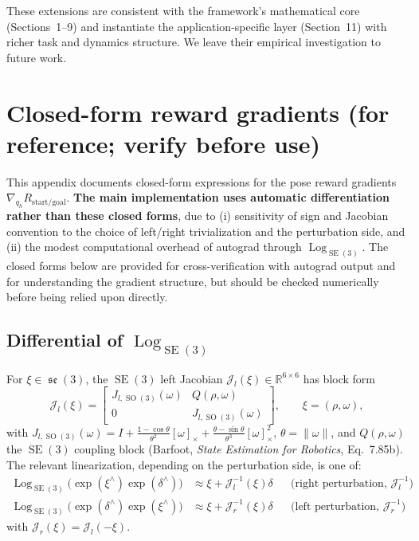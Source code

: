 \documentclass[11pt,a4paper]{article}
\DeclareMathOperator{\Log}{Log}
\DeclareMathOperator{\SE}{SE}
\DeclareMathOperator{\SO}{SO}
\DeclareMathOperator{\se}{\mathfrak{se}}
\newcommand{\R}{\mathbb{R}}
\begin{document}
These extensions are consistent with the framework's mathematical core (Sections~1--9) and instantiate the application-specific layer (Section~11) with richer task and dynamics structure. We leave their empirical investigation to future work.

\appendix

\section{Closed-form reward gradients (for reference; verify before use)}
\label{app:closed-form-grad}

This appendix documents closed-form expressions for the pose reward gradients $\nabla_{q_h} R_{\text{start/goal}}$. \textbf{The main implementation uses automatic differentiation rather than these closed forms}, due to (i) sensitivity of sign and Jacobian convention to the choice of left/right trivialization and the perturbation side, and (ii) the modest computational overhead of autograd through $\Log_{\SE(3)}$. The closed forms below are provided for cross-verification with autograd output and for understanding the gradient structure, but should be checked numerically before being relied upon directly.

\subsection{Differential of $\Log_{\SE(3)}$}

For $\xi \in \se(3)$, the $\SE(3)$ left Jacobian $\mathcal{J}_l(\xi) \in \R^{6 \times 6}$ has block form
\begin{equation}
\mathcal{J}_l(\xi) = \begin{bmatrix} J_{l, \SO(3)}(\omega) & Q(\rho, \omega) \\ 0 & J_{l, \SO(3)}(\omega) \end{bmatrix}, \qquad \xi = (\rho, \omega),
\end{equation}
with $J_{l, \SO(3)}(\omega) = I + \tfrac{1 - \cos \theta}{\theta^2}[\omega]_\times + \tfrac{\theta - \sin \theta}{\theta^3}[\omega]_\times^2$, $\theta = \|\omega\|$, and $Q(\rho, \omega)$ the $\SE(3)$ coupling block (Barfoot, \emph{State Estimation for Robotics}, Eq.~7.85b). The relevant linearization, depending on the perturbation side, is one of:
\begin{align}
\Log_{\SE(3)}\bigl( \exp(\xi^\wedge) \exp(\delta^\wedge) \bigr) &\approx \xi + \mathcal{J}_l^{-1}(\xi) \delta && \text{(right perturbation, } \mathcal{J}_l^{-1}\text{)} \\
\Log_{\SE(3)}\bigl( \exp(\delta^\wedge) \exp(\xi^\wedge) \bigr) &\approx \xi + \mathcal{J}_r^{-1}(\xi) \delta && \text{(left perturbation, } \mathcal{J}_r^{-1}\text{)}
\end{align}
with $\mathcal{J}_r(\xi) = \mathcal{J}_l(-\xi)$.
\end{document}
